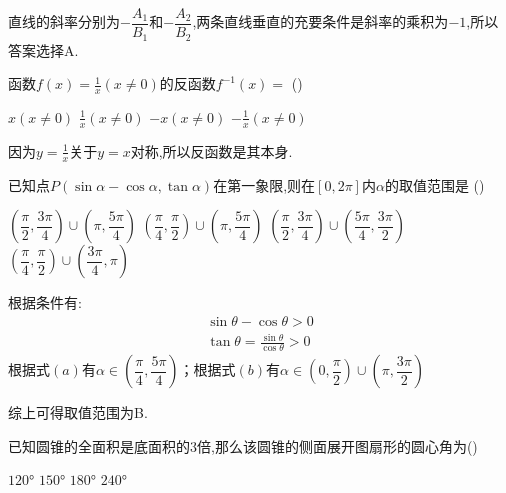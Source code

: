 \begin{questions}
	\begin{solution}
		直线的斜率分别为$-\dfrac{A_1}{B_1}$和$-\dfrac{A_2}{B_2}$,两条直线垂直的充要条件是斜率的乘积为$-1$,所以答案选择A.
	\end{solution}

	\question 函数$f(x)=\frac1x(x\neq0)$的反函数$f^{-1}(x)=$ \hfill (\hspace{1cm})

	\begin{oneparchoices}
		\choice $x ( x\neq0)$ \CorrectChoice $\frac1x(x\neq0)$ \choice $-x (x\neq0)$ \choice $-\frac1x (x\neq0)$
	\end{oneparchoices}
	\begin{solution}
		因为$y=\frac1x$关于$y=x$对称,所以反函数是其本身.
	\end{solution}

	\question 已知点$P(\sin\alpha-\cos\alpha, \tan\alpha)$在第一象限,则在$[0,2\pi]$内$\alpha$的取值范围是 \hfill
	(\hspace{1cm})

	\begin{choices}
		\choice $\left( \dfrac{\pi}{2}, \dfrac{3\pi}{4} \right) \cup \left( \pi, \dfrac{5\pi}{4} \right)$
		\CorrectChoice $\left( \dfrac{\pi}{4}, \dfrac{\pi}{2} \right) \cup \left( \pi, \dfrac{5\pi}{4} \right)$
		\choice $\left( \dfrac{\pi}{2}, \dfrac{3\pi}{4} \right) \cup \left( \dfrac{5\pi}{4}, \dfrac{3\pi}{2} \right)$
		\choice $\left( \dfrac{\pi}{4}, \dfrac{\pi}{2} \right) \cup \left( \dfrac{3\pi}{4}, \pi \right)$
	\end{choices}

	\begin{solution}
		根据条件有:
		\begin{align*}
			\sin\theta - \cos\theta > 0 \tag{a} \\
			\tan\theta = \frac{\sin\theta}{\cos\theta} > 0 \tag{b}
		\end{align*}
		根据式$(a)$有$\alpha \in \left( \dfrac{\pi}{4}, \dfrac{5\pi}{4} \right)$；根据式$(b)$有$\alpha \in \left( 0,
			\dfrac{\pi}{2} \right) \cup \left( \pi, \dfrac{3\pi}{2} \right)$

		综上可得取值范围为B.
	\end{solution}

	\question 已知圆锥的全面积是底面积的$3$倍,那么该圆锥的侧面展开图扇形的圆心角为\hfill (\hspace{1cm})

	\begin{oneparchoices}
		\choice $\ang{120}$
		\choice $\ang{150}$
		\CorrectChoice $\ang{180}$
		\choice $\ang{240}$
	\end{oneparchoices}


\end{questions}

